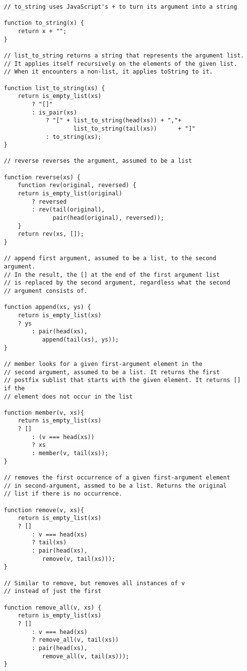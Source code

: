 \begin{lstlisting}
// to_string uses JavaScript's + to turn its argument into a string

function to_string(x) {
    return x + "";
}

// list_to_string returns a string that represents the argument list.
// It applies itself recursively on the elements of the given list.
// When it encounters a non-list, it applies toString to it.

function list_to_string(xs) {
    return is_empty_list(xs)
        ? "[]"
        : is_pair(xs)
            ? "[" + list_to_string(head(xs)) + ","+
                    list_to_string(tail(xs))      + "]"
            : to_string(xs);
}

// reverse reverses the argument, assumed to be a list

function reverse(xs) {
    function rev(original, reversed) {
	return is_empty_list(original)
	    ? reversed
	    : rev(tail(original), 
	          pair(head(original), reversed));
    }
    return rev(xs, []);
}

// append first argument, assumed to be a list, to the second argument.
// In the result, the [] at the end of the first argument list
// is replaced by the second argument, regardless what the second
// argument consists of.

function append(xs, ys) {
    return is_empty_list(xs)
	? ys
        : pair(head(xs),
	       append(tail(xs), ys));
} 

// member looks for a given first-argument element in the 
// second argument, assumed to be a list. It returns the first 
// postfix sublist that starts with the given element. It returns [] if the 
// element does not occur in the list

function member(v, xs){
    return is_empty_list(xs)
	? []
        : (v === head(xs))
	    ? xs
	    : member(v, tail(xs));
}

// removes the first occurrence of a given first-argument element
// in second-argument, assmed to be a list. Returns the original 
// list if there is no occurrence.

function remove(v, xs){
    return is_empty_list(xs)
	? []
        : v === head(xs)
	    ? tail(xs)
	    : pair(head(xs), 
		   remove(v, tail(xs)));
}

// Similar to remove, but removes all instances of v
// instead of just the first

function remove_all(v, xs) {
    return is_empty_list(xs)
	? []
        : v === head(xs)
	    ? remove_all(v, tail(xs))
	    : pair(head(xs), 
	  	   remove_all(v, tail(xs)));
}


\end{lstlisting}
